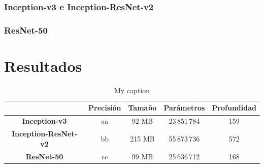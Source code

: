     
    
    
    
	



\subsubsection{Inception-v3 e Inception-ResNet-v2}


\subsubsection{ResNet-50}


















\section{Resultados}

\begin{table}
\centering
\label{my-label}
\begin{tabular}{c|c|c|c|c|}
\cline{2-5}
 & \textbf{Precisión} & \textbf{Tamaño} & \textbf{Parámetros} & \textbf{Profundidad} \\ \hline
\multicolumn{1}{|c|}{\textbf{Inception-v3}} & aa & 92 MB & 23\,851\,784 & 159 \\ \hline
\multicolumn{1}{|c|}{\textbf{Inception-ResNet-v2}} & bb & 215 MB & 55\,873\,736 & 572 \\ \hline
\multicolumn{1}{|c|}{\textbf{ResNet-50}} & cc & 99 MB & 25\,636\,712 & 168 \\ \hline
\end{tabular}
\caption{My caption} \label{Table:Models}
\end{table}



